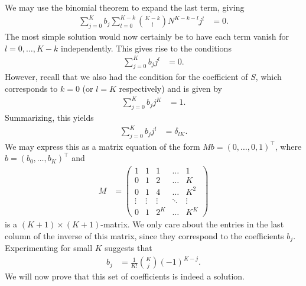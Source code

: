 \documentclass[english, parskip=full]{scrartcl}
\begin{document}
We may use the binomial theorem to expand the last term, giving
\begin{align}
\sum_{j=0}^K b_j \sum_{l=0}^{K-k} \binom{K-k}{l} N^{K-k-l}j^l &= 0.
\end{align}
The most simple solution would now certainly be to have each term vanish for $l=0,\dots,K-k$ independently.
This gives rise to the conditions
\begin{align}
\sum_{j=0}^K b_j j^l &= 0.
\end{align}
However, recall that we also had the condition for the coefficient of $S$, which corresponds to $k=0$ (or $l=K$ respectively) and is given by
\begin{align}
\sum_{j=0}^K b_j j^K &= 1.
\end{align}
Summarizing, this yields
\begin{align}
\sum_{j=0}^K b_j j^l &= \delta_{lK}.
\end{align}
We may express this as a matrix equation of the form $Mb = (0,\dots,0,1)^\top$, where $b=(b_0,\dots , b_K)^\top$ and
\begin{align}
M &= \begin{pmatrix}
1 & 1 & 1 & \dots & 1 \\
0 & 1 & 2 & \dots & K \\
0 & 1 & 4 & \dots & K^2 \\
\vdots & \vdots & \vdots & \ddots & \vdots \\
0 & 1 & 2^K & \dots & K^K
\end{pmatrix}
\end{align}
is a $(K+1)\times (K+1)$-matrix.
We only care about the entries in the last column of the inverse of this matrix, since they correspond to the coefficients $b_j$.
Experimenting for small $K$ suggests that 
\begin{align}
b_j &= \frac{1}{K!}\binom{K}{j}(-1)^{K-j}.
\end{align}
We will now prove that this set of coefficients is indeed a solution.
\end{document}
